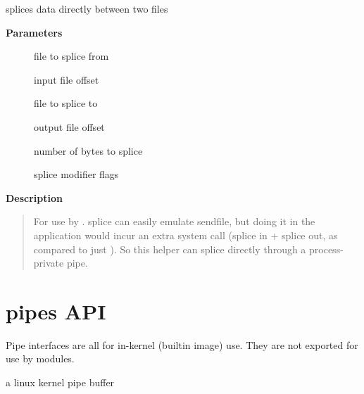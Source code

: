 \documentclass[a4paper,8pt,english]{sphinxmanual}
\begin{document}
\begin{fulllineitems}
\label{filesystems/index:c.do_splice_direct}
splices data directly between two files

\end{fulllineitems}


\textbf{Parameters}
\begin{description}
\item[{}] \leavevmode
file to splice from

\item[{}] \leavevmode
input file offset

\item[{}] \leavevmode
file to splice to

\item[{}] \leavevmode
output file offset

\item[{}] \leavevmode
number of bytes to splice

\item[{}] \leavevmode
splice modifier flags

\end{description}

\textbf{Description}
\begin{quote}

For use by . splice can easily emulate sendfile, but
doing it in the application would incur an extra system call
(splice in + splice out, as compared to just ). So this helper
can splice directly through a process-private pipe.
\end{quote}


\chapter{pipes API}
\label{filesystems/index:pipes-api}
Pipe interfaces are all for in-kernel (builtin image) use. They are not
exported for use by modules.

\begin{fulllineitems}
\label{filesystems/index:c.pipe_buffer}
a linux kernel pipe buffer

\end{fulllineitems}
\end{document}

